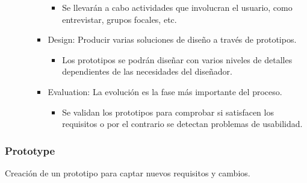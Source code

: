 \documentclass[12pt, twoside, openright]{report} %
\begin{document}
\begin{itemize}
\begin{itemize}
\begin{itemize}
\begin{itemize}
				                  \item Se llevarán a cabo actividades que involucran el usuario,
				                        como entrevistar, grupos focales, etc.
			                  \end{itemize}

			            \item Design: Producir varias soluciones de diseño a través de
			                  prototipos.

			                  \begin{itemize}
				                  \item Los prototipos se podrán diseñar con varios niveles de
				                        detalles dependientes de las necesidades del diseñador.
			                  \end{itemize}

			            \item Evaluation: La evolución es la fase más importante del
			                  proceso.

			                  \begin{itemize}
				                  \item Se validan los prototipos para comprobar si satisfacen los
				                        requisitos o por el contrario se detectan problemas de
				                        usabilidad.
			                  \end{itemize}
		            \end{itemize}
	      \end{itemize}
\end{itemize}

\subsubsection{Prototype}
Creación de un prototipo para captar nuevos requisitos y
cambios.
\end{document}

